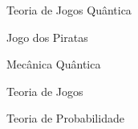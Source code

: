 \begin{palavraschave}
Teoria de Jogos Qu\^antica

Jogo dos Piratas

Mec\^anica Qu\^antica

Teoria de Jogos

Teoria de Probabilidade
\end{palavraschave}
\clearpage
\thispagestyle{empty}
\cleardoublepage